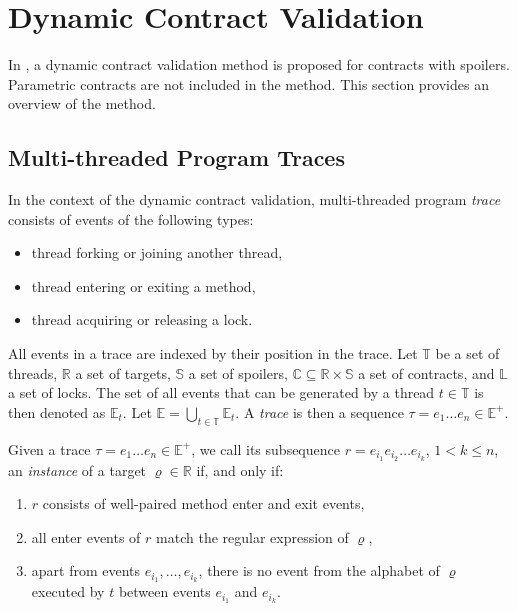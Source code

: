 \section{Dynamic Contract Validation}

In \cite{contracts}, a dynamic contract validation method is proposed for
contracts with spoilers. Parametric contracts are not included in the method.
This section provides an overview of the method.

\subsection{Multi-threaded Program Traces}

In the context of the dynamic contract validation, multi-threaded program
\emph{trace} consists of events of the following types:
\begin{itemize}
    \item thread forking or joining another thread,
    \item thread entering or exiting a method,
    \item thread acquiring or releasing a lock.
\end{itemize}

All events in a trace are indexed by their position in the trace. Let
$\mathbb{T}$ be a set of threads, $\mathbb{R}$ a set of targets, $\mathbb{S}$ a
set of spoilers, $\mathbb{C} \subseteq \mathbb{R} \times \mathbb{S}$ a set of
contracts, and $\mathbb{L}$ a set of locks. The set of all events that can be
generated by a thread $t \in \mathbb{T}$ is then denoted as $\mathbb{E}_t$. Let
$\mathbb{E} = \bigcup_{t \in \mathbb{T}} \mathbb{E}_t$. A \emph{trace} is then a
sequence $\tau = e_1 \hdots e_n \in \mathbb{E}^+$.


Given a trace $\tau = e_1 \hdots e_n \in \mathbb{E}^+$, we call its subsequence
$r = e_{i_1} e_{i_2} \hdots e_{i_k}$, $1 < k \leq n$, an \emph{instance} of a
target $\varrho \in \mathbb{R}$ if, and only if:
\begin{enumerate}
    \item $r$ consists of well-paired method enter and exit events,
    \item all enter events of $r$ match the regular expression of $\varrho$,
    \item apart from events $e_{i_1},\ldots,e_{i_k}$, there is no event from the
        alphabet of $\varrho$ executed by $t$ between events $e_{i_1}$ and
        $e_{i_k}$.
\end{enumerate}

